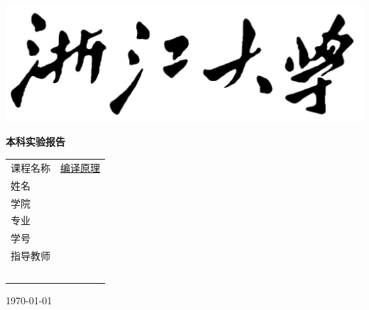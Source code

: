 \documentclass{article}
\begin{document}

\thispagestyle{empty}
\setcounter{page}{-1}

\begin{center}
    \includegraphics[width=0.5\paperwidth]{logo.png}
\end{center}

\vskip 20pt

\begin{center}
    \textbf{本科实验报告}
\end{center}


\vskip 120pt

    \begin{center}
        \bfseries {}

        \begin{tabularx}{.7\textwidth}{>{\fangsong}l >{\fangsong}X<{\centering}}
            课程名称 & \uline{\hfill 编译原理 \hfill} \\
            姓名 &  \uline{\hfill  \hfill} \\
            学院 &  \uline{\hfill  \hfill} \\
            专业 &  \uline{\hfill  \hfill} \\
            学号 &  \uline{\hfill  \hfill} \\
            指导教师 &  \uline{\hfill  \hfill} \\
            ~ & ~\\
        \end{tabularx}
    \end{center}

\vskip 100pt

\begin{center}
     \fangsong
    \today
\end{center}



\newpage

\thispagestyle{empty}

\tableofcontents

\newpage
\end{document}
